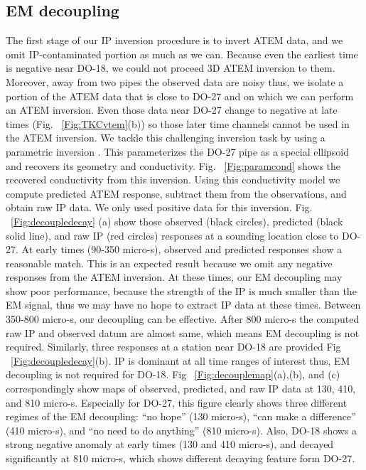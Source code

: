 \documentclass[letterpaper,11pt]{article}
\begin{document}
\subsection{EM decoupling}
The first stage of our IP inversion procedure is to invert ATEM data, and we omit IP-contaminated portion as much as we can. Because even the earliest time is negative near DO-18, we could not proceed 3D ATEM inversion to them. Moreover, away from two pipes the observed data are noisy thus, we isolate a portion of the ATEM data that is close to DO-27 and on which we can perform an ATEM inversion. Even those data near DO-27 change to negative at late times (Fig. ~\ref{Fig:TKCvtem}(b)) so those later time channels cannot be used in the ATEM inversion. We tackle this challenging inversion task by using a parametric inversion \cite[]{McMillan2015}. This parameterizes the DO-27 pipe as a special ellipsoid and recovers its geometry and conductivity. Fig. ~\ref{Fig:paramcond} shows the recovered conductivity from this inversion. Using this conductivity model we compute predicted ATEM response, subtract them from the observations, and obtain raw IP data. We only used positive data for this inversion. Fig. ~\ref{Fig:decoupledecay} (a) show those observed (black circles), predicted (black solid line), and raw IP (red circles) responses at a sounding location close to DO-27. At early times (90-350 micro-s), observed and predicted responses show a reasonable match. This is an expected result because we omit any negative responses from the ATEM inversion. At these times, our EM decoupling may show poor performance, because the strength of the IP is much smaller than the EM signal, thus we may have no hope to extract IP data at these times. Between 350-800 micro-s, our decoupling can  be effective.  After 800 micro-s the computed raw IP and observed datum are almost same, which means EM decoupling is not required. Similarly,  three responses at a station near DO-18 are provided Fig ~\ref{Fig:decoupledecay}(b). IP is dominant at all time ranges of interest thus, EM decoupling is not required for DO-18. Fig ~\ref{Fig:decouplemap}(a),(b), and (c) correspondingly show maps of observed, predicted, and raw IP data at 130, 410, and 810 micro-s. Especially for DO-27, this figure clearly shows three different regimes of the EM decoupling: ``no hope'' (130 micro-s), ``can make a difference'' (410 micro-s), and ``no need to do anything'' (810 micro-s). Also, DO-18 shows a strong negative anomaly at early times (130 and 410 micro-s), and decayed significantly at 810 micro-s, which shows different decaying feature form DO-27. 
\end{document}
